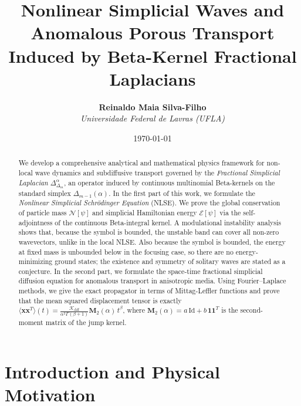 \documentclass[11pt,a4paper]{article}
\title{\textbf{Nonlinear Simplicial Waves and Anomalous Porous Transport Induced by Beta-Kernel Fractional Laplacians}}
\author{\textbf{Reinaldo Maia Silva-Filho} \\ \textit{Universidade Federal de Lavras (UFLA)}}
\date{\today}
\theoremstyle{plain}
\theoremstyle{definition}
\theoremstyle{remark}
\numberwithin{equation}{section}
\begin{document}
\maketitle

\begin{abstract}
We develop a comprehensive analytical and mathematical physics framework for non-local wave dynamics and subdiffusive transport governed by the \emph{Fractional Simplicial Laplacian} $\Delta_{\Delta_m}^\alpha$, an operator induced by continuous multinomial Beta-kernels on the standard simplex $\Delta_{m-1}(\alpha)$. In the first part of this work, we formulate the \emph{Nonlinear Simplicial Schr\"odinger Equation} (NLSE). We prove the global conservation of particle mass $\mathcal{N}[\psi]$ and simplicial Hamiltonian energy $\mathcal{E}[\psi]$ via the self-adjointness of the continuous Beta-integral kernel. A modulational instability analysis shows that, because the symbol is bounded, the unstable band can cover all non-zero wavevectors, unlike in the local NLSE. Also because the symbol is bounded, the energy at fixed mass is unbounded below in the focusing case, so there are no energy-minimizing ground states; the existence and symmetry of solitary waves are stated as a conjecture. In the second part, we formulate the space-time fractional simplicial diffusion equation for anomalous transport in anisotropic media. Using Fourier--Laplace methods, we give the exact propagator in terms of Mittag-Leffler functions and prove that the mean squared displacement tensor is exactly $\langle \mathbf{x}\mathbf{x}^T \rangle(t) = \frac{\mathcal{K}_{\text{diff}}}{\alpha^2 \Gamma(\beta+1)} \mathbf{M}_2(\alpha)\, t^\beta$, where $\mathbf{M}_2(\alpha) = a\,\mathrm{Id} + b\,\mathbf{1}\mathbf{1}^T$ is the second-moment matrix of the jump kernel.
\end{abstract}

\tableofcontents
\newpage

\section{Introduction and Physical Motivation}
\end{document}
